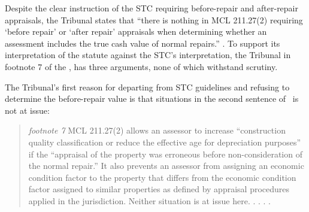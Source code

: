 \documentclass[12pt,\documentclassflag]{michiganCourtOfAppealsBrief}
\begin{document}


Despite the clear instruction of the STC requiring before-repair and after-repair appraisals, the Tribunal states that ``there is nothing in MCL 211.27(2) requiring `before repair' or `after repair' appraisals when determining whether an assessment includes the true cash value of normal repairs.'' \reconsiderationDenied[2]. To support its interpretation of the statute against the STC's interpretation,  the Tribunal in footnote 7 of the \reconsiderationDenied[2], has three arguments, none of which withstand scrutiny.

The Tribunal's first reason for departing from STC guidelines and refusing to determine the before-repair value is that situations in the second sentence of \mathieuGast\ is not at issue:

\begin{quote}
  {\em footnote 7} MCL 211.27(2) allows an assessor to increase ``construction quality classification or reduce the effective age for depreciation purposes'' if the ``appraisal of the property was erroneous before non-consideration of the normal repair.'' It also prevents an assessor from assigning an economic condition factor to the property that differs from the economic condition factor assigned to similar properties as defined by appraisal procedures applied in the jurisdiction. Neither situation is at issue here. . . . \reconsiderationDenied[2].
\end{quote}
\end{document}
